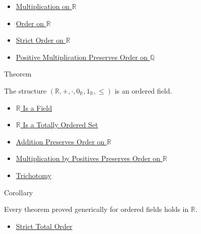 \begin{dependencies}
\begin{itemize}
  \item \hyperref[def:multiplication-on-r]{Multiplication on $\mathbb{R}$}
  \item \hyperref[def:order-on-r]{Order on $\mathbb{R}$}
  \item \hyperref[def:strict-order-on-r]{Strict Order on $\mathbb{R}$}
  \item \hyperref[thm:positive-multiplication-preserves-order-on-q]{Positive Multiplication Preserves Order on $\mathbb{Q}$}
\end{itemize}
\end{dependencies}

\begin{theorembox}{Theorem}
\begin{theorem}
\label{thm:r-is-an-ordered-field}
The structure $(\mathbb{R},+,\cdot,0_{\mathbb{R}},1_{\mathbb{R}},\le)$ is an
ordered field.
\end{theorem}
\end{theorembox}

\begin{dependencies}
\begin{itemize}
  \item \hyperref[thm:r-is-a-field]{$\mathbb{R}$ Is a Field}
  \item \hyperref[thm:r-totally-ordered-set]{$\mathbb{R}$ Is a Totally Ordered Set}
  \item \hyperref[thm:addition-preserves-order-on-r]{Addition Preserves Order on $\mathbb{R}$}
  \item \hyperref[thm:positive-multiplication-preserves-order-on-r]{Multiplication by Positives Preserves Order on $\mathbb{R}$}
  \item \hyperref[def:trichotomy]{Trichotomy}
\end{itemize}
\end{dependencies}

\begin{corollarybox}{Corollary}
\begin{corollary}
\label{cor:ordered-field-laws-on-r}
Every theorem proved generically for ordered fields holds in $\mathbb{R}$.
\end{corollary}
\end{corollarybox}

\begin{dependencies}
\begin{itemize}
  \item \hyperref[def:strict-total-order]{Strict Total Order}
\end{itemize}
\end{dependencies}

